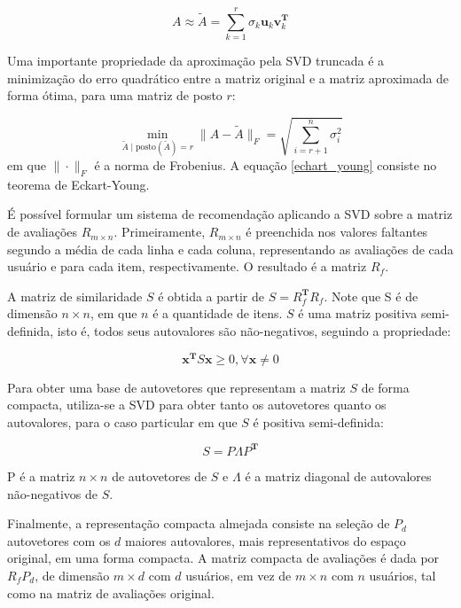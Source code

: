 \begin{equation}
    A \approx \tilde{A} = \sum_{k=1}^{r}\sigma_k \mathbf{u}_k \mathbf{v}_k^{\mathbf{T}}
\end{equation}

Uma importante propriedade da aproximação pela SVD truncada é a minimização do
erro quadrático entre a matriz original e a matriz aproximada de forma ótima,
para uma matriz de posto $r$:

\begin{equation} \label{echart_young}
    \min_{\tilde{A} \mid \text{posto}(\tilde{A}) = r } \|A - \tilde{A}\|_F = \sqrt{\sum_{i=r+1}^{n}\sigma_i^2}
\end{equation}
em que $\| \cdot \|_F$ é a norma de Frobenius. A equação \ref{echart_young}
consiste no teorema de Eckart-Young.


É possível formular um sistema de recomendação aplicando a SVD sobre a matriz de
avaliações $R_{m \times n}$. Primeiramente, $R_{m \times n}$ é preenchida nos
valores faltantes segundo a média de cada linha e cada coluna, representando as
avaliações de cada usuário e para cada item, respectivamente. O resultado é a
matriz $R_f$.

A matriz de similaridade $S$ é obtida a partir de $S = R_f^{\mathbf{T} }R_f$.
Note que S é de dimensão $n \times n$, em que $n$ é a quantidade de itens. $S$ é
uma matriz positiva semi-definida, isto é, todos seus autovalores são
não-negativos, seguindo a propriedade:

\begin{equation}
    \mathbf{x}^{\mathbf{T}} S \mathbf{x} \geq 0, \forall \mathbf{x} \neq 0
\end{equation}

 Para obter uma base de autovetores que representam a matriz $S$ de forma
 compacta, utiliza-se a SVD para obter tanto os autovetores quanto os autovalores,
 para o caso particular em que $S$ é positiva semi-definida:

\begin{equation}
    S = P \Lambda P^{\mathbf{T}}
\end{equation}

P é a matriz $n \times n$ de autovetores de $S$ e $\Lambda$ é a matriz diagonal
de autovalores não-negativos de $S$.

Finalmente, a representação compacta almejada consiste na seleção de $P_d$ autovetores com os $d$
maiores autovalores, mais representativos do espaço original, em uma forma compacta.
A matriz compacta de avaliações é dada por $R_{f}P_{d}$, de dimensão $m \times
d$ com $d$ usuários, em vez de $m \times n$ com $n$ usuários, tal como na matriz
de avaliações original.

